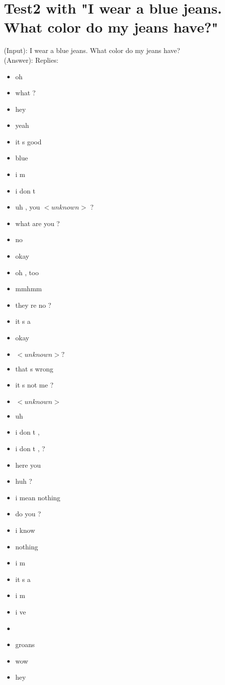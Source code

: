 \section{Test2 with "I wear a blue jeans. What color do my jeans have?"}
\label{apendix:result2:Beam-search-200:OpenSubtitle}
(Input): I wear a blue jeans. What color do my jeans have?\\
(Answer): Replies:
\begin{multicols}{2}
	\begin{itemize}
		\item oh
		\item what ?
		\item hey
		\item yeah
		\item it s good
		\item blue
		\item i m
		\item i don t
		\item uh , you $<unknown>$ ?
		\item what are you ?
		\item no
		\item okay
		\item oh , too
		\item mmhmm
		\item they re no ?
		\item it s a
		\item okay
		\item $<unknown> ?$
		\item that s wrong
		\item it s not me ?
		\item $<unknown>$
		\item uh
		\item i don t ,
		\item i don t , ?
		\item here you
		\item huh ?
		\item i mean nothing
		\item do you ?
		\item i know
		\item nothing
		\item i m
		\item it s a
		\item i m
		\item i ve
		\item
		\item groans
		\item wow
		\item hey

\end{itemize}
\end{multicols}
